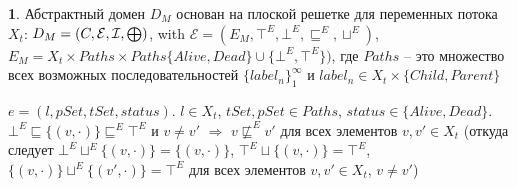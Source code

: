 {\textbf 1.} Абстрактный домен $D_M$ основан на плоской решетке для переменных потока $X_t$: 
$D_M = (C, \mathcal{E}, \mathcal{I}, \mathrel{\bigoplus})$, with $\mathcal{E}=(E_M, \top^E, \bot^E, \sqsubseteq^E, \sqcup^E)$, $E_M = X_t \times Paths \times Paths \{Alive, Dead\} \cup \{\bot^E,\top^E\}) $,
где $Paths$ -- это множество всех возможных последовательностей $\{label_n\}^{\infty}_1$ и $label_n \in X_t \times \{Child, Parent\}$

$e = (l, pSet, tSet, status)$. $l \in X_t$, $tSet, pSet \in Paths$, $status \in \{Alive, Dead\}$.
$\bot^E \sqsubseteq \{(v, \cdot)\} \sqsubseteq^E \top^E$ и $v \neq v'$ $\Rightarrow$ $v \not\sqsubseteq^E v'$ для всех элементов $v, v'\in X_t$ 
(откуда следует $\bot^E \sqcup^E \{(v, \cdot)\} = \{(v, \cdot)\}$, $\top^E \sqcup \{(v, \cdot)\} = \top^E$, $\{(v, \cdot)\} \sqcup^E \{(v', \cdot)\} = \top^E$ для всех элементов $v,v'\in X_t$, $v\neq v'$)

